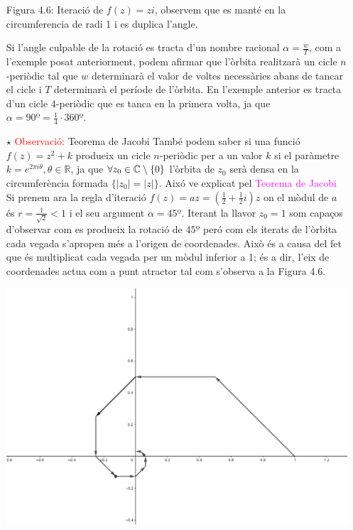 \documentclass[12pt]{report}
\begin{document}
\begin{itemize}
\begin{center}
    \newline
    Figura 4.6: Iteració de $f(z) =zi$, observem que es manté en la circumferencia de radi 1 i es duplica l'angle.
\end{center}
   Si l'angle culpable de la rotació es tracta d'un nombre racional $\alpha= \frac{w}{T}$, com a l'exemple posat anteriorment, podem afirmar que l'òrbita realitzarà un cicle $n$-periòdic tal que $w$ determinarà el valor de voltes necessàries abans de tancar el cicle i $T$ determinarà el període de l'òrbita. En l'exemple anterior es tracta d'un cicle 4-periòdic que es tanca en la primera volta, ja que $\alpha=90º=\frac{1}{4}\cdot 360º$.
\item [$\star$] \textcolor{red}{Observació:} Teorema de Jacobi
\newline
També podem saber si una funció $f(z)=z^2+k$ produeix un cicle $n$-periòdic per a un valor $k$ si el paràmetre $k=e^{2\pi i \theta}, \theta \in \mathbb{R}$, ja que $\forall z_0 \in \mathbb{C} \hspace{0.25em} \backslash \hspace{0.25em} \{0\}$ l'òrbita de $z_0$ serà densa en la circumferència formada          $\{|z_0| = |z| \}$.
    \newline
    Aixó ve explicat pel \textcolor{magenta}{Teorema de Jacobi}
    \newline
    \newline
    \newline
   Si prenem ara la regla d'iteració $f(z)=az=\left( \frac{1}{2} + \frac{1}{2}i \right)z$ on el mòdul de $a$ és $r=\frac{1}{\sqrt{2}}<1$ i el seu argument $\alpha=45º$. Iterant la llavor $z_0=1$ som capaços d'observar com es produeix la rotació de $45º$ peró com els iterats de l'òrbita cada vegada s'apropen més a l'origen de coordenades. Això és a causa del fet que és multiplicat cada vegada per un mòdul inferior a 1; és a dir, l'eix de coordenades actua com a punt atractor tal com s'observa a la Figura 4.6.
    \begin{center}
        \includegraphics[width=0.8 \textwidth]{orbitaatractora.PNG}

\end{center}
\end{itemize}
\end{document}
